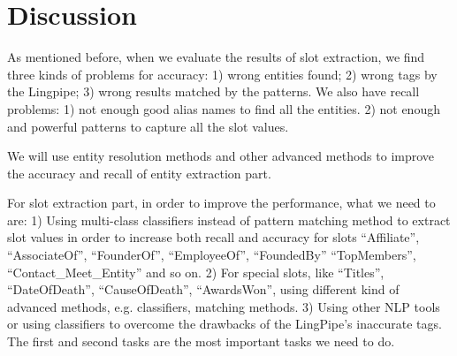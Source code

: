 

\section{Discussion}

As mentioned before, when we evaluate the results of slot extraction, we find three kinds of problems for accuracy: 1) wrong entities found; 2) wrong tags by the Lingpipe; 3) wrong results matched by the patterns.  We also have recall problems: 1) not enough good alias names to find all the entities. 2) not enough and powerful patterns to capture all the slot values. 

We will use entity resolution methods and other advanced methods to improve the accuracy and recall of entity extraction part. 

For slot extraction part, in order to improve the performance, what we need to are: 1) Using multi-class classifiers instead of pattern matching method to extract slot values in order to increase both recall and accuracy for slots “Affiliate”, “AssociateOf”, “FounderOf”, “EmployeeOf”, “FoundedBy” “TopMembers”, “Contact\_Meet\_Entity” and so on. 2) For special slots, like “Titles”, “DateOfDeath”, “CauseOfDeath”, “AwardsWon”, using different kind of advanced methods, e.g. classifiers, matching methods. 3) Using other NLP tools or using classifiers to overcome the drawbacks of the LingPipe’s inaccurate tags. The first and second tasks are the most important tasks we need to do.


